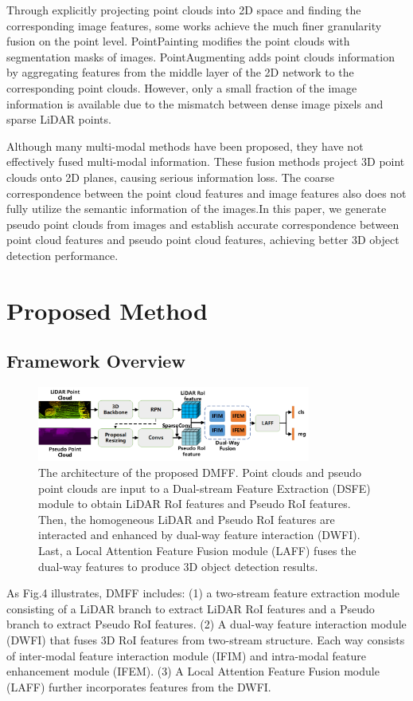 \begin{sloppypar}
Through explicitly projecting point clouds into 2D space and finding the corresponding image features, some works achieve the much finer granularity fusion on the point level. PointPainting\cite{28} modifies the point clouds with segmentation masks of images. PointAugmenting\cite{29} adds point clouds information by aggregating features from the middle layer of the 2D network to the corresponding point clouds. However, only a small fraction of the image information is available due to the mismatch between dense image pixels and sparse LiDAR points. 


Although many multi-modal methods have been proposed, they have not effectively fused multi-modal information. These fusion methods project 3D point clouds onto 2D planes, causing serious information loss. The coarse correspondence between the point cloud features and image features also does not fully utilize the semantic information of the images.In this paper, we generate pseudo point clouds from  images and establish accurate correspondence between point cloud features and pseudo point cloud features, achieving better 3D object detection performance.

\section{Proposed Method}
\subsection{Framework Overview}
\begin{figure}[h]
\centering
\includegraphics[width=9cm]{new_images/fig14.png}
\caption{The architecture of the proposed DMFF. Point clouds and pseudo point clouds are input to a Dual-stream Feature Extraction (DSFE) module to obtain LiDAR RoI features and Pseudo RoI features. Then, the homogeneous LiDAR and Pseudo RoI features are interacted and enhanced by dual-way feature interaction (DWFI). Last, a Local Attention Feature Fusion module (LAFF) fuses the dual-way features to produce 3D object detection results.}
\label{fig_sim}
\end{figure}

As Fig.4 illustrates, DMFF includes: (1) a two-stream feature extraction module consisting of a LiDAR branch to extract LiDAR RoI features and a Pseudo branch to extract Pseudo RoI features. (2) A dual-way feature interaction module (DWFI) that fuses 3D RoI features from two-stream structure. Each way consists of inter-modal feature interaction module (IFIM) and intra-modal feature enhancement module (IFEM). (3) A Local Attention Feature Fusion module (LAFF) further incorporates features from the DWFI.

\end{sloppypar}

